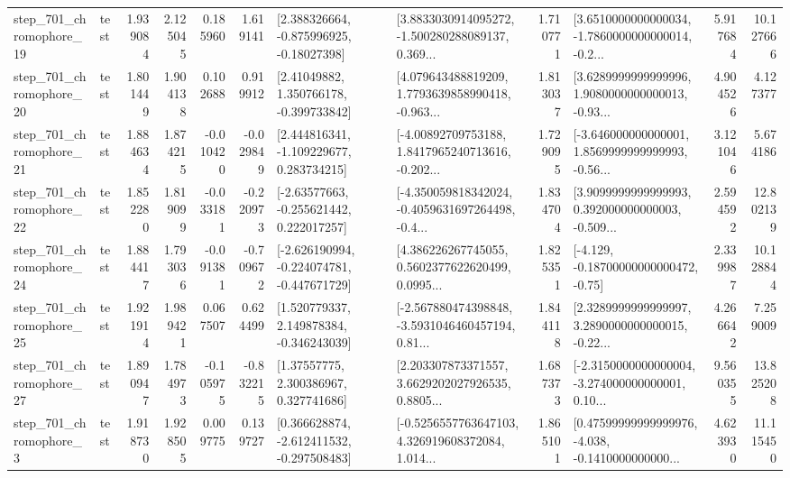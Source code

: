 \begin{tabular}{llrrrrllrlrr}
  step\_701\_chromophore\_19 &      test &      1.939084 &    2.125045 &      0.185960 &  1.619141 &    [2.388326664, -0.875996925, -0.18027398] &  [3.8833030914095272, -1.500280288089137, 0.369... &       1.710771 &  [3.6510000000000034, -1.7860000000000014, -0.2... &            5.917684 &         10.127666 \\
  step\_701\_chromophore\_20 &      test &      1.801449 &    1.904138 &      0.102688 &  0.919912 &     [2.41049882, 1.350766178, -0.399733842] &  [4.079643488819209, 1.7793639858990418, -0.963... &       1.813037 &  [3.6289999999999996, 1.9080000000000013, -0.93... &            4.904526 &          4.127377 \\
  step\_701\_chromophore\_21 &      test &      1.884634 &    1.874215 &     -0.010420 & -0.029849 &    [2.444816341, -1.109229677, 0.283734215] &  [-4.00892709753188, 1.8417965240713616, -0.202... &       1.729095 &  [-3.646000000000001, 1.8569999999999993, -0.56... &            3.121046 &          5.674186 \\
  step\_701\_chromophore\_22 &      test &      1.852280 &    1.819099 &     -0.033181 & -0.220973 &    [-2.63577663, -0.255621442, 0.222017257] &  [-4.350059818342024, -0.4059631697264498, -0.4... &       1.834704 &  [3.9099999999999993, 0.392000000000003, -0.509... &            2.594592 &         12.802139 \\
  step\_701\_chromophore\_24 &      test &      1.884417 &    1.793036 &     -0.091381 & -0.709672 &  [-2.626190994, -0.224074781, -0.447671729] &  [4.386226267745055, 0.5602377622620499, 0.0995... &       1.825351 &              [-4.129, -0.18700000000000472, -0.75] &            2.339987 &         10.128844 \\
  step\_701\_chromophore\_25 &      test &      1.921914 &    1.989421 &      0.067507 &  0.624499 &    [1.520779337, 2.149878384, -0.346243039] &  [-2.567880474398848, -3.5931046460457194, 0.81... &       1.844118 &  [2.3289999999999997, 3.2890000000000015, -0.22... &            4.266642 &          7.259009 \\
  step\_701\_chromophore\_27 &      test &      1.890947 &    1.784973 &     -0.105975 & -0.832215 &      [1.37557775, 2.300386967, 0.327741686] &  [2.203307873371557, 3.6629202027926535, 0.8805... &       1.687373 &  [-2.3150000000000004, -3.274000000000001, 0.10... &            9.560355 &         13.825208 \\
   step\_701\_chromophore\_3 &      test &      1.918730 &    1.928505 &      0.009775 &  0.139727 &   [0.366628874, -2.612411532, -0.297508483] &  [-0.5256557763647103, 4.326919608372084, 1.014... &       1.865101 &  [0.47599999999999976, -4.038, -0.1410000000000... &            4.623930 &         11.115450 \\

\end{tabular}
